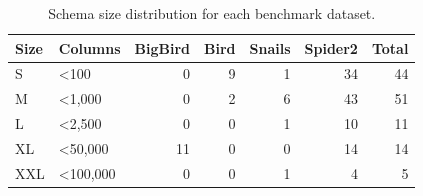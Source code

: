 \begin{table}
\caption{Schema size distribution for each benchmark dataset.}
\label{tab:benchmark-schema-sizes}
\begin{tabular}{llrrrrr}
\toprule
Size & Columns & BigBird & Bird & Snails & Spider2 & Total \\
\midrule
S & <100 & 0 & 9 & 1 & 34 & 44 \\
M & <1,000 & 0 & 2 & 6 & 43 & 51 \\
L & <2,500 & 0 & 0 & 1 & 10 & 11 \\
XL & <50,000 & 11 & 0 & 0 & 14 & 14 \\
XXL & <100,000 & 0 & 0 & 1 & 4 & 5 \\
\bottomrule
\end{tabular}
\end{table}
